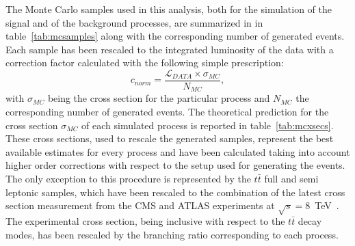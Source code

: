 The Monte Carlo samples used in this analysis, both for the simulation of the signal and 
of the background processes, are summarized in
in table~\ref{tab:mcsamples} along with the corresponding number of 
generated events.
Each sample has been rescaled to the integrated luminosity of the data with a correction 
factor calculated with the following simple prescription:
$$c_{norm} = \frac{\mathcal{L}_{DATA} \times \sigma_{MC}}{N_{MC}} \mathrm{,}$$
with $\sigma_{MC}$ being the cross section for the particular process and $N_{MC}$ the 
corresponding number of generated events.
The theoretical prediction for the cross section $\sigma_{MC}$ of each 
simulated process is reported in table~\ref{tab:mcxsecs}.
These cross sections, used to rescale the generated samples, 
represent the best available estimates for every process and 
have been calculated taking into account higher order 
corrections with respect to the setup used for generating the events.
The only exception to this 
procedure is represented by the $t\bar{t}$ full and semi leptonic samples, 
which have been rescaled to the combination of the latest cross section measurement 
from the CMS and ATLAS experiments at $\sqrt{s}=8$~TeV~\cite{ttbarxsecATLASCMS}.
The experimental cross section, being inclusive with respect to the 
$t\bar{t}$ decay modes, has been rescaled by the 
branching ratio corresponding to each process.

